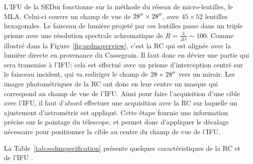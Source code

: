 \documentclass[../main/main.tex]{subfiles}
\begin{document}
L'IFU de la SEDm fonctionne sur la méthode du réseau de micro-lentilles,
le MLA. Celui-ci couvre un champ de vue de $28^{\prime\prime}\times28^{\prime\prime}$, avec
$45\times52$ lentilles hexagonales. Le faisceau de lumière projeté par
ces lentilles passe dans un triple prisme avec une résolution spectrale
achromatique de $R=\frac{\lambda}{\Delta\lambda}\sim100$.
Comme illustré dans la Figure~\ref{fig:sedmoverview}, c'est la RC qui
est alignée avec la lumière directe en provenance du Cassegrain. Il faut donc en dévier une
partie qui sera transmise à l'IFU: cela est effectué avec un
prisme d'interception centré sur le faisceau incident, qui va rediriger
le champ de $28\times28^{\prime\prime}$ vers un miroir. Les images
photométriques de la RC ont donc en leur centre un masque qui correspond
au champ de vue de l'IFU. Ainsi pour faire l'acquisition d'une cible
avec l'IFU, il faut d'abord effectuer une acquisition avec la RC sur
laquelle un ajustement d'astrométrie est appliqué. Cette étape fournie une
information précise sur le pointage du télescope, et permet donc
d'appliquer le décalage nécessaire pour positionner la cible au centre du
champ de vue de l'IFU.

La Table~\ref{tab:sedmspecification} présente
quelques caractéristiques de la RC et de l'IFU \citep{SEDM18}.
\end{document}
